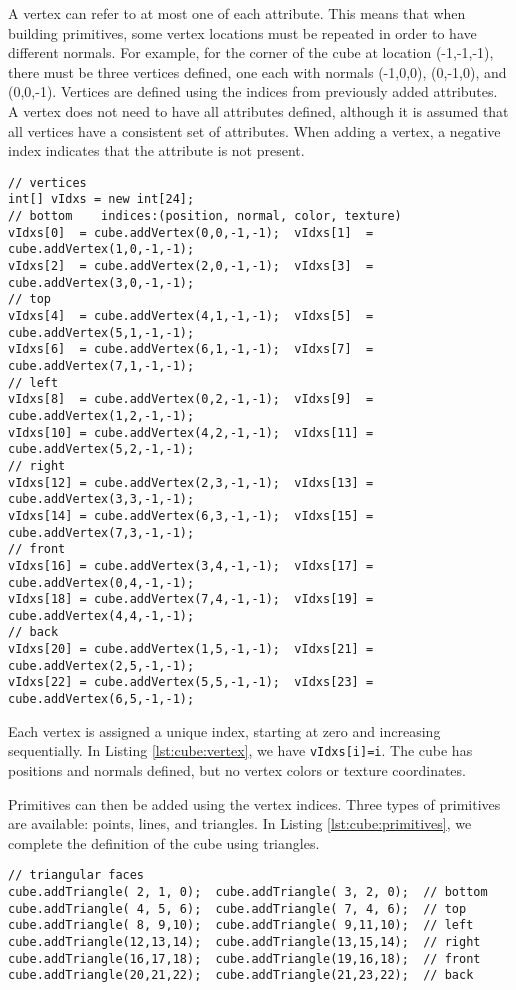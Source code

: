 \documentclass{article}
\begin{document}
A vertex can refer to at most one of each attribute.  This means that when building 
primitives, some vertex locations must be repeated in order to have different normals.
For example, for the corner of the cube at location (-1,-1,-1), there must be three
vertices defined, one each with normals (-1,0,0), (0,-1,0), and (0,0,-1).  Vertices
are defined using the indices from previously added attributes.  A vertex does not need
to have all attributes defined, although it is assumed that all vertices have a consistent
set of attributes.  When adding a vertex, a negative index indicates that the
 attribute is not present.
\begin{lstlisting}[caption=Adding vertices to the cube,label=lst:cube:vertex]
// vertices
int[] vIdxs = new int[24];
// bottom    indices:(position, normal, color, texture)
vIdxs[0]  = cube.addVertex(0,0,-1,-1);  vIdxs[1]  = cube.addVertex(1,0,-1,-1);
vIdxs[2]  = cube.addVertex(2,0,-1,-1);  vIdxs[3]  = cube.addVertex(3,0,-1,-1);
// top
vIdxs[4]  = cube.addVertex(4,1,-1,-1);  vIdxs[5]  = cube.addVertex(5,1,-1,-1);
vIdxs[6]  = cube.addVertex(6,1,-1,-1);  vIdxs[7]  = cube.addVertex(7,1,-1,-1);
// left
vIdxs[8]  = cube.addVertex(0,2,-1,-1);  vIdxs[9]  = cube.addVertex(1,2,-1,-1);
vIdxs[10] = cube.addVertex(4,2,-1,-1);  vIdxs[11] = cube.addVertex(5,2,-1,-1);
// right
vIdxs[12] = cube.addVertex(2,3,-1,-1);  vIdxs[13] = cube.addVertex(3,3,-1,-1);
vIdxs[14] = cube.addVertex(6,3,-1,-1);  vIdxs[15] = cube.addVertex(7,3,-1,-1);
// front
vIdxs[16] = cube.addVertex(3,4,-1,-1);  vIdxs[17] = cube.addVertex(0,4,-1,-1);
vIdxs[18] = cube.addVertex(7,4,-1,-1);  vIdxs[19] = cube.addVertex(4,4,-1,-1);
// back
vIdxs[20] = cube.addVertex(1,5,-1,-1);  vIdxs[21] = cube.addVertex(2,5,-1,-1);
vIdxs[22] = cube.addVertex(5,5,-1,-1);  vIdxs[23] = cube.addVertex(6,5,-1,-1);
\end{lstlisting}
Each vertex is assigned a unique index, starting at zero and increasing sequentially.  In Listing
\ref{lst:cube:vertex}, we have \lstinline{vIdxs[i]=i}.  The cube has positions and normals
defined, but no vertex colors or texture coordinates.

Primitives can then be added using the vertex indices.  Three types of primitives are
available: points, lines, and triangles.  In Listing \ref{lst:cube:primitives}, we complete
the definition of the cube using triangles.
\begin{lstlisting}[caption={Adding triangle primitives to complete the cube}, label=lst:cube:primitives]
// triangular faces
cube.addTriangle( 2, 1, 0);  cube.addTriangle( 3, 2, 0);  // bottom
cube.addTriangle( 4, 5, 6);  cube.addTriangle( 7, 4, 6);  // top
cube.addTriangle( 8, 9,10);  cube.addTriangle( 9,11,10);  // left
cube.addTriangle(12,13,14);  cube.addTriangle(13,15,14);  // right
cube.addTriangle(16,17,18);  cube.addTriangle(19,16,18);  // front
cube.addTriangle(20,21,22);  cube.addTriangle(21,23,22);  // back
\end{lstlisting}
\end{document}

